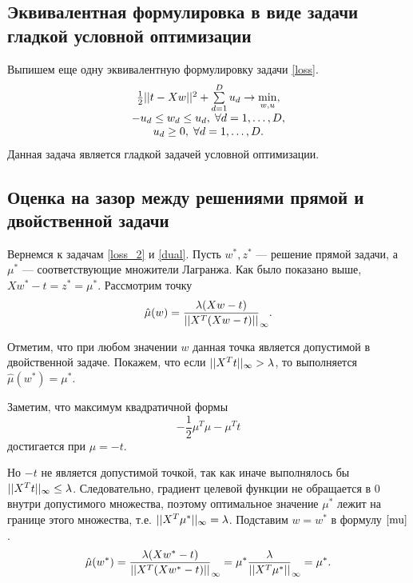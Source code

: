 \documentclass[12pt]{article}
\begin{document}
	
	\subsection{Эквивалентная формулировка в виде задачи гладкой условной оптимизации}
		Выпишем еще одну эквивалентную формулировку задачи \ref{loss}. 
		\begin{equation}\label{smooth}
		\begin{array}[l]{c}
			\frac 1 2 \norm{t - Xw}^2 + \sum\limits_{d = 1}^D u_d \rightarrow \min\limits_{w, u},\\
			-u_d \le w_d \le u_d, \hspace{0.1cm}\forall d= 1, \ldots, D, \\
			u_d \ge 0, \hspace{0.1cm}\forall d = 1, \ldots, D.
			
		\end{array}
		\end{equation}
 		Данная задача является гладкой задачей условной оптимизации.

	\subsection{Оценка на зазор между решениями прямой и двойственной задачи}
		Вернемся к задачам  \ref{loss_2} и \ref{dual}. Пусть $w^*, z^*$ — решение прямой задачи, а $\mu^*$ — соответствующие множители Лагранжа. Как было показано выше, $X w^* - t = z^* = \mu^*$. Рассмотрим точку 
		\begin{equation} \label{mu}
			\hat\mu(w) = \frac {\lambda (Xw - t)} {||X^T(X w - t)||}_\infty.
		\end{equation}
		
		Отметим, что при любом значении $w$ данная точка является допустимой в двойственной задаче. Покажем, что если $||X^T t||_{\infty} > \lambda$, то выполняется $\hat\mu(w^*) = \mu^*$.
		
		Заметим, что максимум квадратичной формы 
		$$- \frac 1 2 \mu^T \mu - \mu^T t$$
		достигается при $\mu = -t$. 
		
		
		Но $-t$ не является допустимой точкой, так как иначе выполнялось бы $||X^T t||_{\infty} \le \lambda$. Следовательно, градиент целевой функции не обращается в $0$ внутри допустимого множества, поэтому оптимальное значение $\mu^*$ лежит на границе этого множества, т.е. $||X^T \mu^*||_\infty = \lambda$. Подставим $w = w^*$ в формулу $\ref{mu}$.
		$$\hat\mu(w^*) =  \frac {\lambda (Xw^* - t)} {||X^T(X w^* - t)||}_\infty =  \mu^*\frac {\lambda} {||X^T\mu^*||}_\infty = \mu^*.$$
		
\end{document}

